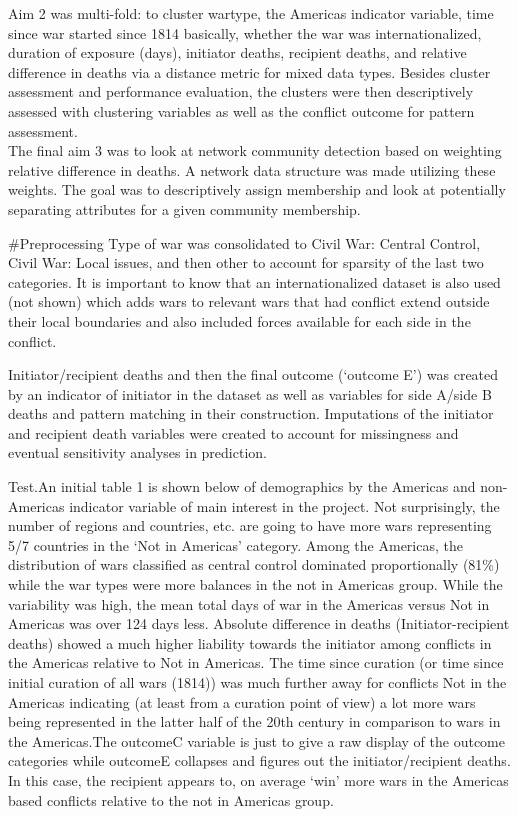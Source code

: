 \documentclass[
]{article}
\begin{document}
Aim 2 was multi-fold: to cluster wartype, the Americas indicator
variable, time since war started since 1814 basically, whether the war
was internationalized, duration of exposure (days), initiator deaths,
recipient deaths, and relative difference in deaths via a distance
metric for mixed data types. Besides cluster assessment and performance
evaluation, the clusters were then descriptively assessed with
clustering variables as well as the conflict outcome for pattern
assessment.\\

The final aim 3 was to look at network community detection based on
weighting relative difference in deaths. A network data structure was
made utilizing these weights. The goal was to descriptively assign
membership and look at potentially separating attributes for a given
community membership.

\#Preprocessing Type of war was consolidated to Civil War: Central
Control, Civil War: Local issues, and then other to account for sparsity
of the last two categories. It is important to know that an
internationalized dataset is also used (not shown) which adds wars to
relevant wars that had conflict extend outside their local boundaries
and also included forces available for each side in the conflict.

Initiator/recipient deaths and then the final outcome (`outcome E') was
created by an indicator of initiator in the dataset as well as variables
for side A/side B deaths and pattern matching in their construction.
Imputations of the initiator and recipient death variables were created
to account for missingness and eventual sensitivity analyses in
prediction.

Test.An initial table 1 is shown below of demographics by the Americas
and non-Americas indicator variable of main interest in the project. Not
surprisingly, the number of regions and countries, etc. are going to
have more wars representing 5/7 countries in the `Not in Americas'
category. Among the Americas, the distribution of wars classified as
central control dominated proportionally (81\%) while the war types were
more balances in the not in Americas group. While the variability was
high, the mean total days of war in the Americas versus Not in Americas
was over 124 days less. Absolute difference in deaths
(Initiator-recipient deaths) showed a much higher liability towards the
initiator among conflicts in the Americas relative to Not in Americas.
The time since curation (or time since initial curation of all wars
(1814)) was much further away for conflicts Not in the Americas
indicating (at least from a curation point of view) a lot more wars
being represented in the latter half of the 20th century in comparison
to wars in the Americas.The outcomeC variable is just to give a raw
display of the outcome categories while outcomeE collapses and figures
out the initiator/recipient deaths. In this case, the recipient appears
to, on average `win' more wars in the Americas based conflicts relative
to the not in Americas group.
\end{document}
